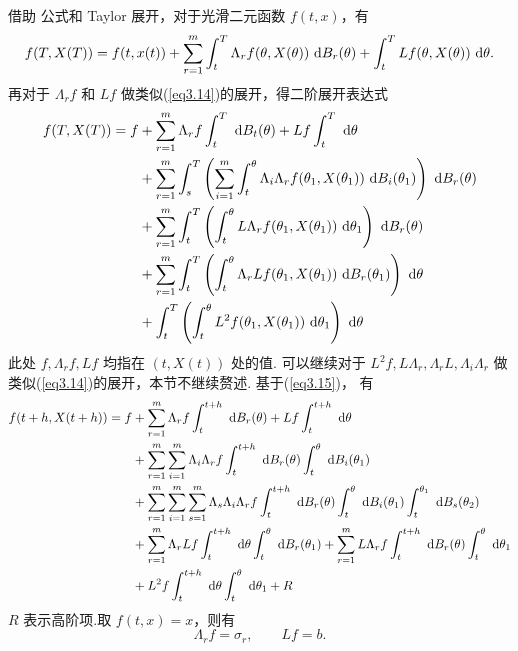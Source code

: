 借助 \ito 公式和 Taylor 展开，对于光滑二元函数 $f(t,x)$，有
\begin{equation}\label{eq3.14}
f(T,X(T)) = f(t,x(t)) + \sum_{r=1}^m \int_t^T \Lambda_r f(\theta,X(\theta)) \text{ d} B_r(\theta) + \int_t^T Lf(\theta,X(\theta)) \text{ d} \theta.
\end{equation}
再对于 $\Lambda_rf$ 和 $Lf$ 做类似(\ref{eq3.14})的展开，得二阶展开表达式
\begin{equation}\label{eq3.15}
\begin{aligned}
	f(T,X(T)) = f  &+ \sum_{r=1}^m \Lambda_rf \int_t^T \text{ d} B_t(\theta) + Lf\int_t^T\text{ d} \theta\\
	&+\sum_{r=1}^m \int_s^T \left( \sum_{i=1}^m \int_t^\theta \Lambda_i\Lambda_r f(\theta_1,X(\theta_1))\text{ d} B_i(\theta_1) \right) \text{ d} B_r(\theta)\\
	&+\sum_{r=1}^m \int_t^T \left(  \int_t^\theta L\Lambda_r f(\theta_1,X(\theta_1))\text{ d} \theta_1\right) \text{ d} B_r(\theta) \\
	&+ \sum_{r=1}^m \int_t^T \left(  \int_t^\theta \Lambda_r Lf(\theta_1,X(\theta_1))\text{ d} B_r(\theta_1)\right) \text{ d} \theta \\
	&+\int_t^T \left( \int_t^\theta L^2 f(\theta_1,X(\theta_1)) \text{ d}\theta_1\right)\text{ d} \theta
\end{aligned} 
\end{equation}
此处 $f,\Lambda_rf,Lf$ 均指在 $(t,X(t))$ 处的值. 可以继续对于 $L^2f,L\Lambda_r,\Lambda_rL,\Lambda_i\Lambda_r$ 做类似(\ref{eq3.14})的展开，本节不继续赘述. 基于(\ref{eq3.15})， 有
\begin{equation}\label{eq3.16}
\begin{aligned} 
	f(t+h,X(t+h)) = f &+ \sum_{r=1}^m \Lambda_rf\int_t^{t+h} \text{ d} B_r(\theta) + Lf \int_t^{t+h} \text{ d} \theta \\
	& + \sum_{r=1}^m\sum_{i=1}^m \Lambda_i\Lambda_rf \int_t^{t+h} \text{ d} B_r(\theta) \int_t^\theta \text{ d} B_i(\theta_1)\\
	& + \sum_{r=1}^m\sum_{i=1}^m\sum_{s=1}^m \Lambda_s\Lambda_i\Lambda_r f
	\int_t^{t+h}\text{ d} B_r(\theta) \int_t^\theta \text{ d} B_i(\theta_1) \int_t^{\theta_1} \text{ d} B_s(\theta_2)\\
	&+\sum_{r=1}^m \Lambda_rLf \int_t^{t+h} \text{ d} \theta \int_t^\theta \text{ d} B_r(\theta_1)
	 +\sum_{r=1}^m L\Lambda_rf \int_t^{t+h} \text{ d} B_r(\theta) \int_t^\theta \text{ d} \theta_1\\
	&+L^2f\int_t^{t+h} \text{ d} \theta \int_t^\theta\text{ d} \theta_1 + R 
\end{aligned}
\end{equation}
$R$ 表示高阶项.取 $f(t,x)=x$，则有
\[
\Lambda_rf = \sigma_r,\qquad Lf=b.
\]
